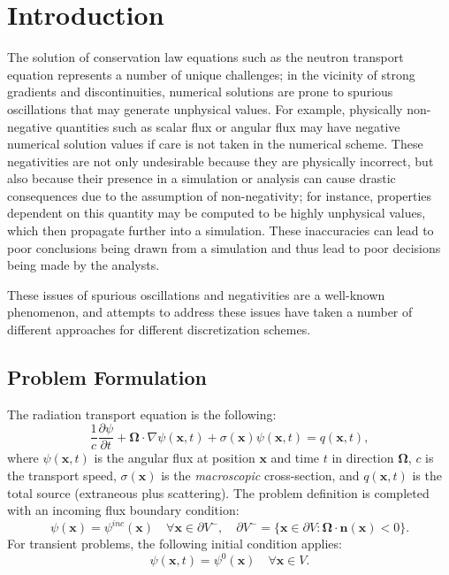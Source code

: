 \section{Introduction}
The solution of conservation law equations such as the neutron transport
equation represents a number of unique challenges; in the vicinity of strong
gradients and discontinuities, numerical solutions are prone to spurious
oscillations that may generate unphysical values. For example, physically
non-negative quantities such as scalar flux or angular flux may have negative
numerical solution values if care is not taken in the numerical scheme.
These negativities are not only undesirable because they are physically
incorrect, but also because their presence in a simulation or analysis
can cause drastic consequences due to the assumption of non-negativity;
for instance, properties dependent on this quantity may be computed
to be highly unphysical values, which then propagate further into
a simulation. These inaccuracies can lead to poor conclusions being drawn
from a simulation and thus lead to poor decisions being made by the analysts.

These issues of spurious oscillations and negativities are a well-known
phenomenon, and attempts to address these issues have taken a number
of different approaches for different discretization schemes.





\subsection{Problem Formulation}
The radiation transport equation is the following:
\begin{equation}\label{tr}
	\frac{1}{c}\frac{\partial \psi}{\partial t} + \mathbf{\Omega}\cdot\nabla\psi(\mathbf{x},t)
      + \sigma(\mathbf{x})\psi(\mathbf{x},t) = q(\mathbf{x},t),
\end{equation}
where $\psi(\mathbf{x},t)$ is the angular flux at position $\mathbf{x}$ and time
$t$ in direction $\mathbf{\Omega}$, $c$ is the transport speed, $\sigma(\mathbf{x})$
is the \emph{macroscopic} cross-section, and $q(\mathbf{x},t)$ is the
total source (extraneous plus scattering).
The problem definition is completed with an incoming flux boundary condition:
\begin{equation}
   \psi(\mathbf{x}) = \psi^{inc}(\mathbf{x})  \quad \forall \mathbf{x}\in \partial V^-,
      \quad \partial V^- = \{\mathbf{x}\in\partial V: \mathbf{\Omega}\cdot\mathbf{n}(\mathbf{x})<0\}.
\end{equation}
For transient problems, the following initial condition applies:
\begin{equation}
   \psi(\mathbf{x},t) = \psi^0(\mathbf{x})  \quad \forall \mathbf{x}\in V.
\end{equation}
